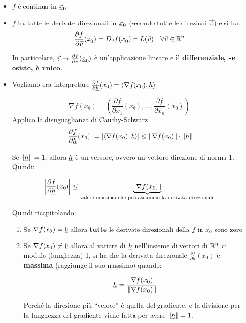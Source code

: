 \begin{itemize}
    \item \(f\) è continua in \(\underline{x}_0\)
    \item \(f\) ha tutte le derivate direzionali in \(\underline{x}_0\) (secondo tutte le direzioni \(\vec{v} \)) e si ha:
          \[\frac{\partial f}{\partial \vec{v}}(\underline{x}_0) = D_{ \vec{v} } f(\underline{x}_0) = L(\vec{v} ) \quad\forall \vec{v} \in \mathbb{R}^{n} \]

          In particolare, \(\vec{v} \mapsto \frac{\partial f}{\partial \vec{v}}(\underline{x}_0)\) è un'applicazione lineare e \textbf{il differenziale, se esiste, è unico}.
    \item

          Vogliamo ora interpretare \(\frac{\partial f}{\partial \underline{h}}(x_0)= \langle \nabla f(x_0), \underline{h} \rangle \):

          \[
              \nabla f(x_0) = \left( \frac{\partial f}{\partial x_1}(x_0),\ldots, \frac{\partial f}{\partial x_n}(x_0) \right)
          \]
          Applico la disuguaglianza di Cauchy-Schwarz
          \[
              \left|\frac{\partial f}{\partial \underline{h}}(x_0)\right| = \left|\langle \nabla f(x_0),\underline{h} \rangle \right| \le \left\lVert \nabla f(x_0)\right\rVert \cdot \left\lVert\underline{h} \right\rVert
          \]

          Se \(\left\lVert\underline{h} \right\rVert = 1\), allora \(\underline{h} \) è un versore, ovvero un vettore direzione di norma 1. Quindi:

          \[
              \left|\frac{\partial f}{\partial \underline{h}}(x_0)\right| \le \underbrace{\left\lVert\nabla f(x_0)\right\rVert}_\text{valore massimo che può assumere la derivata direzionale}
          \]

          Quindi ricapitolando:

          \begin{enumerate}
              \item Se \(\nabla f(x_0) = \underline{0} \) allora \textbf{tutte} le derivate direzionali della \(f\) in \(x_0\) sono zero
              \item Se \(\nabla f(x_0) \neq \underline{0} \) allora al variare di \(\underline{h} \) nell'insieme di vettori di \(\mathbb{R}^{n} \) di modulo (lunghezza) 1, si ha che la derivata direzionale \(\frac{\partial f}{\partial h}(x_0)\) è \textbf{massima} (raggiunge il suo massimo) quando:

                    \[
                        \underline{h} = \frac{\nabla f(x_0)}{\left\lVert\nabla f(x_0)\right\rVert}
                    \]

                    Perché la direzione più ``veloce'' è quella del gradiente, e la divisione per la lunghezza del gradiente viene fatta per avere \(\left\lVert\underline{h}\right\rVert=1\).
          \end{enumerate}
\end{itemize}

